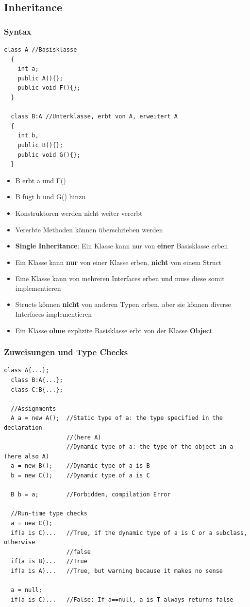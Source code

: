 \subsection{Inheritance}
\subsubsection{Syntax}
\begin{lstlisting}[style=Csharp]
  class A //Basisklasse
  {
    int a; 
    public A(){};
    public void F(){};
  }
  
  class B:A //Unterklasse, erbt von A, erweitert A
  {
    int b, 
    public B(){};
    public void G(){};
  }
\end{lstlisting}
\begin{itemize}
  \item B erbt a und F()
  \item B fügt b und G() hinzu
  \item Konstruktoren werden nicht weiter vererbt
  \item Vererbte Methoden können überschrieben werden
  \item \textbf{Single Inheritance}: Ein Klasse kann nur von \textbf{einer}
  Basisklasse erben 
  \item Ein Klasse kann \textbf{nur} von einer Klasse erben, \textbf{nicht} von
  einem Struct
  \item Eine Klasse kann von mehreren Interfaces erben und 
  muss diese somit implementieren
  \item Structs können \textbf{nicht} von anderen Typen erben, aber sie können
  diverse Interfaces implementieren
  \item Ein Klasse \textbf{ohne} explizite Basisklasse erbt von der Klasse
  \textbf{Object}
\end{itemize}
 
\subsubsection{Zuweisungen und Type Checks}
\begin{lstlisting}[style=Csharp]
  class A{...};
  class B:A{...};
  class C:B{...};
  
  //Assignments
  A a = new A();  //Static type of a: the type specified in the declaration
                  //(here A)
                  //Dynamic type of a: the type of the object in a (here also A)
  a = new B();    //Dynamic type of a is B
  b = new C();    //Dynamic type of a is C
  
  B b = a;        //Forbidden, compilation Error
  
  //Run-time type checks
  a = new C(); 
  if(a is C)...   //True, if the dynamic type of a is C or a subclass, otherwise
                  //false
  if(a is B)...   //True
  if(a is A)...   //True, but warning because it makes no sense
  
  a = null; 
  if(a is C)...   //False: If a==null, a is T always returns false
\end{lstlisting}

